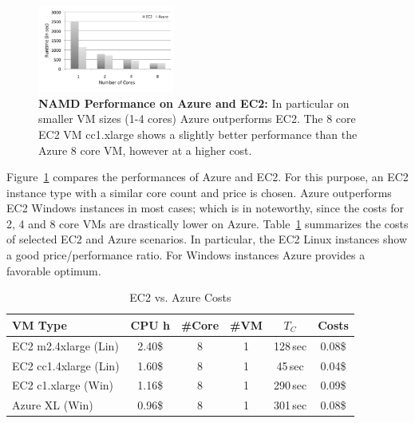 \documentclass[conference,final]{IEEEtran}
\newcommand{\up}{\vspace*{-1em}}
\newcommand{\tc}{$T_{C}$ }
\begin{document}
\begin{figure}[t]
    \centering
        \includegraphics[width=0.4\textwidth]{performance/namd_ec2_azure.pdf}
        \up
        \caption{\textbf{NAMD Performance on Azure and EC2:} In
          particular on smaller VM sizes (1-4 cores) Azure outperforms
          EC2. The 8 core EC2 VM cc1.xlarge shows a slightly better
          performance than the Azure 8 core VM, however at a higher
          cost.} %
    \label{fig:performance_namd_ec2_azure}
    \up\up
\end{figure}

Figure~\ref{fig:performance_namd_ec2_azure} compares the performances
of Azure and EC2. For this purpose, an EC2 instance type with a similar core
count and price is chosen. Azure outperforms EC2 Windows instances in 
most cases; which is in noteworthy, since the costs for 2, 4 and 8 core VMs are
drastically lower on Azure. Table~\ref{tbl:costs} summarizes the
costs of selected EC2 and Azure scenarios. In particular, the EC2
Linux instances show a good price/performance ratio. For Windows
instances Azure provides a favorable optimum.



\begin{table}[ht]
    \centering
	\begin{scriptsize}
		\begin{tabular}{|l|c|c|c|c|c|}
	        \hline
	        VM Type                 &CPU h  &\#Core &\#VM &\tc &Costs  \\ \hline
	        EC2 m2.4xlarge (Lin)  &2.40\$  &8          &1      &128\,sec     &0.08\$ \\ \hline
	        EC2 cc1.4xlarge (Lin) &1.60\$  &8          &1      &45\,sec     &0.04\$ \\ \hline
	        EC2 c1.xlarge   (Win)   &1.16\$  &8          &1      &290\,sec    &0.09\$ \\ \hline
	        Azure XL (Win)  &0.96\$ &8          &1      &301\,sec    &0.08\$ \\ \hline
		\end{tabular}
	\end{scriptsize}
	\caption{EC2 vs. Azure Costs\label{tbl:costs}}
	\up
\end{table}
\end{document}
